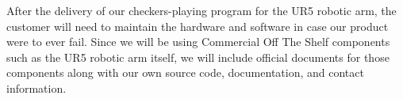 

After the delivery of our checkers-playing program for the UR5 robotic arm, the customer will need to maintain the hardware and software in case our product were to ever fail. Since we will be using Commercial Off The Shelf components such as the UR5 robotic arm itself, we will include official documents for those components along with our own source code, documentation, and contact information.


